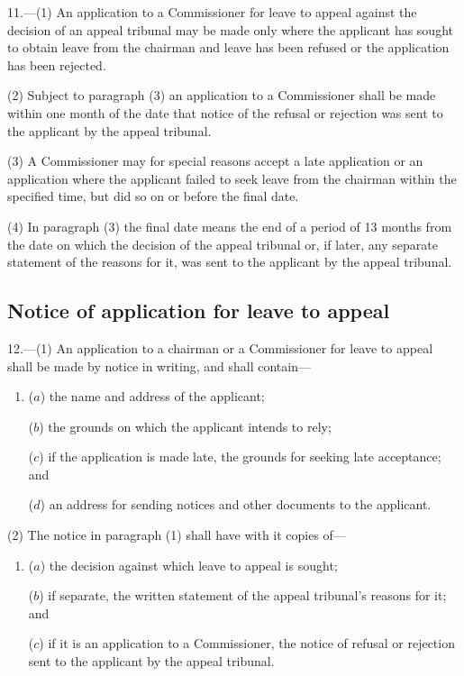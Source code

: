 \documentclass[12pt,a4paper]{article}
\begin{document}
11.—(1) An application to a Commissioner for leave to appeal against the decision of an appeal tribunal may be made only where the applicant has sought to obtain leave from the chairman and leave has been refused or the application has been rejected.

(2) Subject to paragraph (3) an application to a Commissioner shall be made within one month of the date that notice of the refusal or rejection was sent to the applicant by the appeal tribunal.

(3) A Commissioner may for special reasons accept a late application or an application where the applicant failed to seek leave from the chairman within the specified time, but did so on or before the final date.

(4) In paragraph (3) the final date means the end of a period of 13 months from the date on which the decision of the appeal tribunal or, if later, any separate statement of the reasons for it, was sent to the applicant by the appeal tribunal.

\subsection[12. Notice of application for leave to appeal]{Notice of application for leave to appeal}

12.—(1) An application to a chairman or a Commissioner for leave to appeal shall be made by notice in writing, and shall contain---
\begin{enumerate}\item[]
($a$) the name and address of the applicant;

($b$) the grounds on which the applicant intends to rely;

($c$) if the application is made late, the grounds for seeking late acceptance; and

($d$) an address for sending notices and other documents to the applicant.
\end{enumerate}

(2) The notice in paragraph (1) shall have with it copies of---
\begin{enumerate}\item[]
($a$) the decision against which leave to appeal is sought;

($b$) if separate, the written statement of the appeal tribunal’s reasons for it; and

($c$) if it is an application to a Commissioner, the notice of refusal or rejection sent to the applicant by the appeal tribunal.
\end{enumerate}
\end{document}
